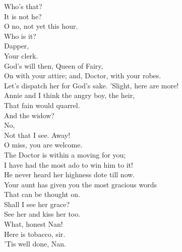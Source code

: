 \documentclass[a4paper,oneside,12pt]{memoir}
\begin{document}
\begin{drama*}
\facespeaks {} Who's that?\\
\subtlespeaks {} It is not he?\\
\facespeaks O no, not yet this hour.\\
\subtlespeaks {} Who is it?\\
\dolspeaks {} Dapper,\\
Your clerk.\\
\facespeaks {} God's will then, Queen of Fairy,\\
On with your attire; and, Doctor, with your robes.\\
Let's dispatch her for God's sake.
 'Slight, here are more!\\
Annie and I think the angry boy, the heir,\\
That fain would quarrel.\\
\subtlespeaks {} And the widow?\\
\facespeaks {} No,\\
Not that I see. Away!\\
 O miss, you are welcome.\\
The Doctor is within a moving for you;\\
I have had the most ado to win him to it!\\
He never heard her highness dote till now.\\
Your aunt has given you the most gracious words\\
That can be thought on.\\
\dapperspeaks {} Shall I see her grace?\\
\facespeaks See her and kiss her too.\\
 What, honest Nan!\\
\druggerspeaks Here is tobacco, sir.\\
\facespeaks {} 'Tis well done, Nan.\\

\end{drama*}
\end{document}
